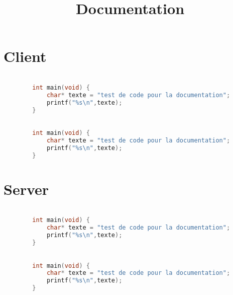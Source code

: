 \documentclass[11pt]{article}
\title{Documentation}
\begin{document}
    \maketitle
    \tableofcontents
    \newpage

    \section{Client}
    \begin{lstlisting}[language=C, caption=C example]

        int main(void) {
            char* texte = "test de code pour la documentation";
            printf("%s\n",texte);
        }

    \end{lstlisting}
    \newline
    \begin{lstlisting}[language=C, caption=C example]

        int main(void) {
            char* texte = "test de code pour la documentation";
            printf("%s\n",texte);
        }

    \end{lstlisting}
    \newline
    
    \section{Server}
    \begin{lstlisting}[language=C, caption=C example]

        int main(void) {
            char* texte = "test de code pour la documentation";
            printf("%s\n",texte);
        }

    \end{lstlisting}
    \newline
    \begin{lstlisting}[language=C, caption=C example]

        int main(void) {
            char* texte = "test de code pour la documentation";
            printf("%s\n",texte);
        }

    \end{lstlisting}
    \newline
\end{document}
